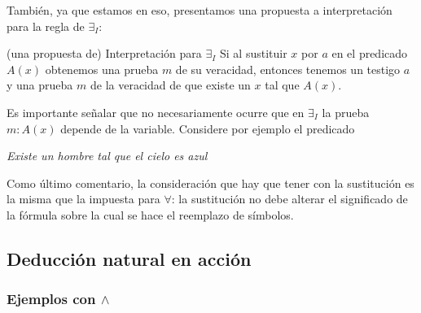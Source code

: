 \documentclass{article}
\begin{document}
También, ya que estamos en eso, presentamos una propuesta a interpretación para
la regla de $\exists_I$:

\begin{sfwt}{(una propuesta de) Interpretación para $\exists_I$}
    Si al sustituir $x$ por $a$ en el predicado $A(x)$ obtenemos una
    prueba $m$ de su veracidad, entonces tenemos un testigo $a$ y una prueba
    $m$ de la veracidad de que existe un $x$ tal que $A(x)$.
\end{sfwt}

\begin{remark}
    Es importante señalar que no necesariamente ocurre que en $\exists_I$
    la prueba $m : A(x)$ depende de la variable. Considere por ejemplo
    el predicado
    \begin{center}
        \textit{Existe un hombre tal que el cielo es azul}
    \end{center}
\end{remark}

Como último comentario, la consideración que hay que tener con la sustitución es la misma que la impuesta para $\forall$: la sustitución no debe alterar el significado de la fórmula sobre la cual se hace el reemplazo de símbolos.
\subsection{Deducción natural en acción}
\label{subsection:deduccion-nat-accion}

\subsubsection{Ejemplos con $\wedge$}
\end{document}
